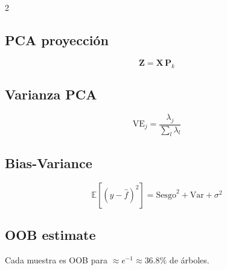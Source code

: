 \documentclass[12pt, a4paper]{article}
\newcommand{\E}{\mathbb{E}}
\begin{document}
\begin{multicols}{2}
\subsection*{PCA proyección}
\[
  \mathbf{Z} = \mathbf{X}\,\mathbf{P}_k
\]

\subsection*{Varianza PCA}
\[
  \text{VE}_j = \frac{\lambda_j}{\sum_l \lambda_l}
\]

\subsection*{Bias-Variance}
\[
  \E[(y-\hat{f})^2] = \text{Sesgo}^2 + \text{Var} + \sigma^2
\]

\subsection*{OOB estimate}
Cada muestra es OOB para $\approx e^{-1} \approx 36.8\%$ de árboles.
\end{multicols}
\end{document}
